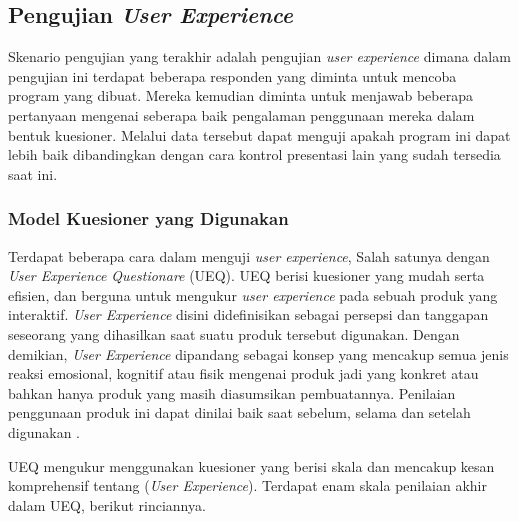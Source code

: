 \subsection{Pengujian \emph{User Experience}}
\label{subsec:Pengujian User Experience} 

Skenario pengujian yang terakhir adalah pengujian \emph{user experience} dimana dalam pengujian ini terdapat beberapa responden yang diminta untuk mencoba program yang dibuat. Mereka kemudian diminta untuk menjawab beberapa pertanyaan mengenai seberapa baik pengalaman penggunaan mereka dalam bentuk kuesioner. Melalui data tersebut dapat menguji apakah program ini dapat lebih baik dibandingkan dengan cara kontrol presentasi lain yang sudah tersedia saat ini.

\subsubsection{Model Kuesioner yang Digunakan}
\label{subsubsec:Model Kuesioner yang Digunakan}
Terdapat beberapa cara dalam menguji \emph{user experience}, Salah satunya dengan \emph{User Experience Questionare} (UEQ). UEQ berisi kuesioner yang mudah serta efisien, dan berguna untuk mengukur \emph{user experience} pada sebuah produk yang interaktif. \emph{User Experience} disini didefinisikan sebagai persepsi dan tanggapan seseorang yang dihasilkan saat suatu produk tersebut digunakan. Dengan demikian, \emph{User Experience} dipandang sebagai konsep yang mencakup semua jenis reaksi emosional, kognitif atau fisik mengenai produk jadi yang konkret atau bahkan hanya produk yang masih diasumsikan pembuatannya. Penilaian penggunaan produk ini dapat dinilai baik saat sebelum, selama dan setelah digunakan \parencite{AndreasHinderks}. 

UEQ mengukur menggunakan kuesioner yang berisi skala dan mencakup kesan komprehensif tentang (\emph{User Experience}). Terdapat enam skala penilaian akhir dalam UEQ, berikut rinciannya.

